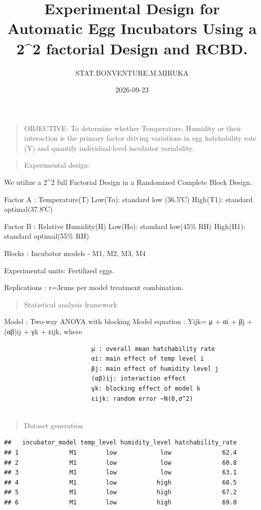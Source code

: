 \documentclass[
]{article}
\title{Experimental Design for Automatic Egg Incubators Using a 2\^{}2
factorial Design and RCBD.}
\author{STAT.BONVENTURE.M.MIRUKA}
\date{2026-09-23}
\begin{document}
\maketitle

\begin{quote}
OBJECTIVE: To determine whether Temperature, Humidity or their
interaction is the primary factor driving variations in egg hatchability
rate (Y) and quantify individual-level incubator variability.
\end{quote}

\begin{quote}
Experimental design:
\end{quote}

We utilize a 2\^{}2 full Factorial Design in a Randomized Complete Block
Design.

Factor A : Temperature(T) Low(To): standard low (36.5℃) High(T1):
standard optimal(37.8℃)

Factor B : Relative Humidity(H) Low(Ho): standard low(45\% RH) High(H1):
standard optimal(55\% RH)

Blocks : Incubator models - M1, M2, M3, M4

Experimental units: Fertilized eggs.

Replications : r=3runs per model treatment combination.

\begin{quote}
Statistical analysis framework
\end{quote}

Model : Two-way ANOVA with blocking Model equation : Yijk= μ + αi + βj +
(αβ)ij + γk + εijk, where

\begin{verbatim}
                        μ : overall mean hatchability rate
                        αi: main effect of temp level i
                        βj: main effect of humidity level j
                        (αβ)ij: interaction effect
                        γk: blocking effect of model k
                        εijk: random error ~N(0,σ^2)
                        
\end{verbatim}

\begin{quote}
Dataset generation
\end{quote}

\begin{verbatim}
##   incubator_model temp_level humidity_level hatchability_rate
## 1              M1        low            low              62.4
## 2              M1        low            low              60.8
## 3              M1        low            low              63.1
## 4              M1        low           high              68.5
## 5              M1        low           high              67.2
## 6              M1        low           high              69.0
\end{verbatim}
\end{document}
